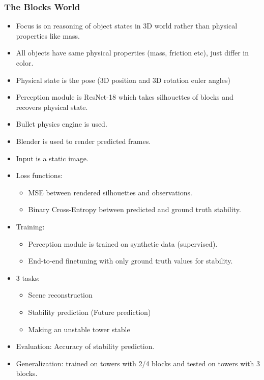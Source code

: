 \documentclass{article}
\begin{document}
    \subsubsection{The Blocks World}\label{subsubsec:Learning_to_See_Physics_via_Visual_De_animation:block-towers}
    \begin{itemize}
        \item Focus is on reasoning of object states in 3D world rather than physical properties like mass.
        \item All objects have same physical properties (mass, friction etc), just differ in color.
        \item Physical state is the pose (3D position and 3D rotation euler angles)
        \item Perception module is ResNet-18 which takes silhouettes of blocks and recovers physical state.
        \item Bullet physics engine is used.
        \item Blender is used to render predicted frames.
        \item Input is a static image.
        \item Loss functions:
        \begin{itemize}
            \item MSE between rendered silhouettes and observations.
            \item Binary Cross-Entropy between predicted and ground truth stability.
        \end{itemize}
        \item Training:
        \begin{itemize}
            \item Perception module is trained on synthetic data (supervised).
            \item End-to-end finetuning with only ground truth values for stability.
        \end{itemize}
        \item 3 tasks:
        \begin{itemize}
            \item Scene reconstruction
            \item Stability prediction (Future prediction)
            \item Making an unstable tower stable
        \end{itemize}
        \item Evaluation: Accuracy of stability prediction.
        \item Generalization: trained on towers with 2/4 blocks and tested on towers with 3 blocks.
    \end{itemize}
\end{document}
